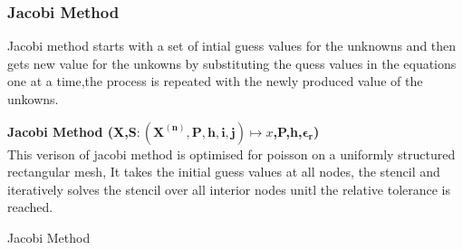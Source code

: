 \subsubsection{Jacobi Method}
Jacobi method starts with a set of intial guess values for the unknowns and then gets new value for the unkowns by substituting the quess values in the equations one at a time,the process is repeated with the newly produced value of the unkowns.\\[2mm]
\begin{algorithm}[H]
    \textbf{Jacobi Method (X,$\mathbf{S:(X^{(n)},P,h,i,j)} \mapsto x$,P,h,$\mathbf{\epsilon_r}$)}\\[-1pt]  
    This verison of jacobi method is optimised for poisson on a uniformly structured rectangular mesh, It takes the initial guess values at all nodes, the stencil and iteratively solves the stencil over all interior nodes unitl the relative tolerance is reached.  \\[2mm]
    \caption{Jacobi Method}
\end{algorithm}


